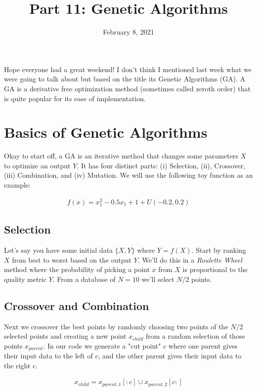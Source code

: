 \documentclass[12pt]{article}
\title{\textbf{Part 11: Genetic Algorithms}}
\begin{document}
\date{February 8, 2021}
\maketitle

Hope everyone had a great weekend! I don't think I mentioned last week what we were going to talk about but based on the title its Genetic Algorithms (GA). A GA is a derivative free optimization method (sometimes called zeroth order) that is quite popular for its ease of implementation.

\section{Basics of Genetic Algorithms}

Okay to start off, a GA is an iterative method that changes some parameters $X$ to optimize an output $Y$. It has four distinct parts: (i) Selection, (ii), Crossover, (iii) Combination, and (iv) Mutation. We will use the following toy function as an example:

\begin{align*}
f(x)=x_1^2-0.5x_1+1+U(-0.2,0.2)
\end{align*}

\subsection{Selection}

Let's say you have some initial data $\{X,Y\}$ where $Y=f(X)$. Start by ranking $X$ from best to worst based on the output $Y$. We'll do this in a \emph{Roulette Wheel} method where the probability of picking a point $x$ from $X$ is proportional to the quality metric $Y$. From a database of $N=10$ we'll select $N/2$ points. 

\subsection{Crossover and Combination}

Next we crossover the best points by randomly choosing two points of the $N/2$ selected points and creating a new point $x_{child}$ from a random selection of those points $x_{parent}$. In our code we generate a "cut point" $c$ where one parent gives their input data to the left of $c$, and the other parent gives their input data to the right $c$. 

\begin{align*}
x_{child}=x_{parent,1}[:c] \cup x_{parent,2}[c:]
\end{align*}
\end{document}
